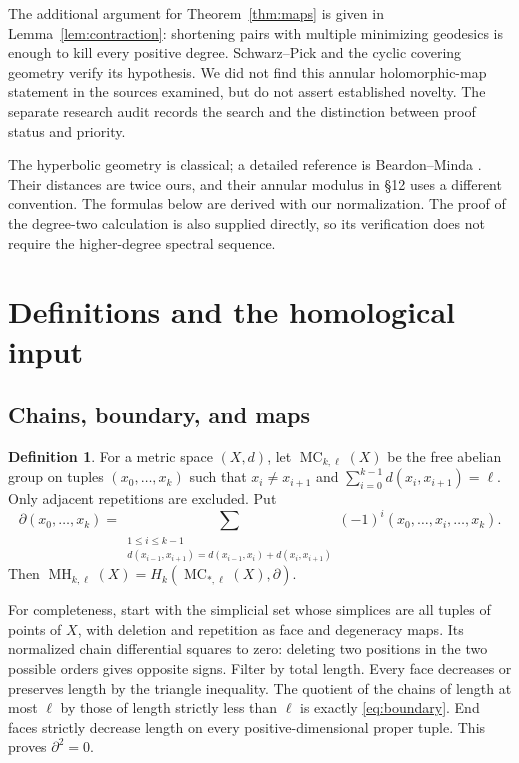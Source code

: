 \documentclass[12pt]{amsart}
\theoremstyle{definition}
\newtheorem{defn}[thm]{Definition}
\theoremstyle{remark}
\numberwithin{equation}{section}
\DeclareMathOperator{\MH}{MH}
\DeclareMathOperator{\MC}{MC}
\begin{document}
The additional argument for Theorem~\ref{thm:maps} is given in Lemma~\ref{lem:contraction}: shortening pairs with multiple minimizing geodesics is enough to kill every positive degree. Schwarz--Pick and the cyclic covering geometry verify its hypothesis. We did not find this annular holomorphic-map statement in the sources examined, but do not assert established novelty. The separate research audit records the search and the distinction between proof status and priority.

The hyperbolic geometry is classical; a detailed reference is Beardon--Minda \cite[\S\S3,10,12]{BM}. Their distances are twice ours, and their annular modulus in \S12 uses a different convention. The formulas below are derived with our normalization. The proof of the degree-two calculation is also supplied directly, so its verification does not require the higher-degree spectral sequence.

\section{Definitions and the homological input}\label{sec:prelim}
\subsection{Chains, boundary, and maps}
\begin{defn}\label{def:chains}
For a metric space $(X,d)$, let $\MC_{k,\ell}(X)$ be the free abelian group on tuples $(x_0,\ldots,x_k)$ such that $x_i\ne x_{i+1}$ and $\sum_{i=0}^{k-1}d(x_i,x_{i+1})=\ell$. Only adjacent repetitions are excluded. Put
\begin{equation}\label{eq:boundary}
 \partial(x_0,\ldots,x_k)=
 \sum_{\substack{1\le i\le k-1\\d(x_{i-1},x_{i+1})=d(x_{i-1},x_i)+d(x_i,x_{i+1})}}
 (-1)^i(x_0,\ldots,\widehat{x_i},\ldots,x_k).
\end{equation}
Then $\MH_{k,\ell}(X)=H_k(\MC_{*,\ell}(X),\partial)$.
\end{defn}
For completeness, start with the simplicial set whose simplices are all tuples of points of $X$, with deletion and repetition as face and degeneracy maps. Its normalized chain differential squares to zero: deleting two positions in the two possible orders gives opposite signs. Filter by total length. Every face decreases or preserves length by the triangle inequality. The quotient of the chains of length at most $\ell$ by those of length strictly less than $\ell$ is exactly \eqref{eq:boundary}. End faces strictly decrease length on every positive-dimensional proper tuple. This proves $\partial^2=0$.
\end{document}
